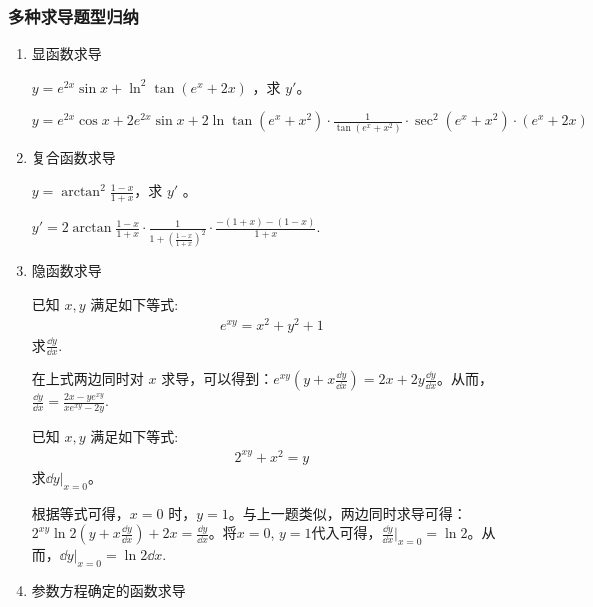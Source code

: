     \subsubsection*{多种求导题型归纳}
    \begin{enumerate}
        \item 显函数求导
        \begin{example}
            $ y = e^{2x}\sin x + \ln^2{\tan(e^x+2x)}$ ，求 $ y' $。
        \end{example}
        \begin{solution}
            $ y = e^{2x}\cos x + 2e^{2x}\sin x + 2\ln{\tan(e^x + x^2)}\cdot\displaystyle\frac{1}{\tan(e^x+x^2)}\cdot\sec^2(e^x+x^2)\cdot(e^x+2x)$
        \end{solution}
        \item 复合函数求导
        \begin{example}
            $ y = \arctan^2\displaystyle\frac{1-x}{1+x} $，求 $y'$ 。
        \end{example}
        \begin{solution}
            $y' = 2\arctan\displaystyle\frac{1-x}{1+x}\cdot\displaystyle\frac{1}{1+(\frac{1-x}{1+x})^2}\cdot\displaystyle\frac{-(1+x)-(1-x)}{1+x}$.
        \end{solution}
        \item 隐函数求导
        \begin{example}
            已知 $x,y$ 满足如下等式:
            \begin{align*}
                e^{xy} = x^2+y^2+1
            \end{align*}
            求$\displaystyle\frac{\dd y}{\dd x}$.
        \end{example}
        \begin{solution}
            在上式两边同时对 $x$ 求导，可以得到：$e^{xy}(y+x\displaystyle\frac{\dd y}{\dd x}) = 2x+2y\displaystyle\frac{\dd y}{\dd x}$。从而，$\displaystyle\frac{\dd y}{\dd x} = \displaystyle\frac{2x-ye^{xy}}{xe^{xy}-2y}$.
        \end{solution}
        \begin{example}
            已知 $x,y$ 满足如下等式:
            \begin{align*}
                2^{xy} + x^2 = y
            \end{align*}
            求$\dd y \big |_{x=0}$。
        \end{example}
        \begin{solution}
            根据等式可得，$x=0$ 时，$y = 1$。与上一题类似，两边同时求导可得：$2^{xy}\ln 2(y+x\displaystyle\frac{\dd y}{\dd x}) + 2x = \displaystyle\frac{\dd y}{\dd x}$。将$x=0$, $y = 1$代入可得，$\displaystyle\frac{\dd y}{\dd x}\bigg |_{x=0} = \ln 2$。从而，$\dd y \big |_{x=0} = \ln 2 \dd x$.
        \end{solution}
        \item 参数方程确定的函数求导
    \end{enumerate}






